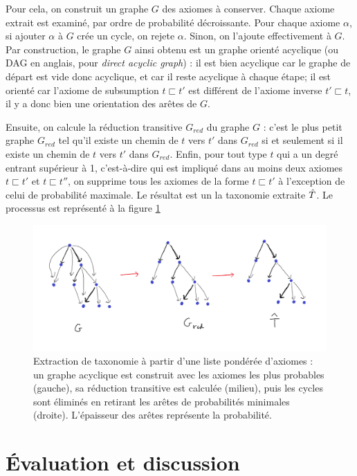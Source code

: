 Pour cela, on construit un graphe $G$ des axiomes à conserver. Chaque axiome extrait est examiné, par ordre de probabilité décroissante. Pour chaque axiome $\alpha$, si ajouter $\alpha$ à $G$ crée un cycle, on rejete $\alpha$. Sinon, on l'ajoute effectivement à $G$. Par construction, le graphe $G$ ainsi obtenu est un graphe orienté acyclique (ou DAG en anglais, pour \textit{direct acyclic graph}) : il est bien acyclique car le graphe de départ est vide donc acyclique, et car il reste acyclique à chaque étape; il est orienté car l'axiome de subsumption $t \sqsubset t'$ est différent de l'axiome inverse $t' \sqsubset t$, il y a donc bien une orientation des arêtes de $G$. 

Ensuite, on calcule la réduction transitive $G_{red}$ du graphe $G$ : c'est le plus petit graphe $G_{red}$ tel qu'il existe un chemin de $t$ vers $t'$ dans $G_{red}$ si et seulement si il existe un chemin de $t$ vers $t'$ dans $G_{red}$. Enfin, pour tout type $t$ qui a un degré entrant supérieur à 1, c'est-à-dire qui est impliqué dans au moins deux axiomes $t \sqsubset t'$ et $t\sqsubset t''$, on supprime tous les axiomes de la forme $t \sqsubset t'$ à l'exception de celui de probabilité maximale. Le résultat est un la taxonomie extraite $\hat{T}$. Le processus est représenté à la figure \ref{fig:softmapping-extraction}

\begin{figure}
    \centering
    \includegraphics[width=\textwidth]{img/softmapping_extraction.png}
    \caption{Extraction de taxonomie à partir d'une liste pondérée d'axiomes : un graphe acyclique est construit avec les axiomes les plus probables (gauche), sa réduction transitive est calculée (milieu), puis les cycles sont éliminés en retirant les arêtes de probabilités minimales (droite). L'épaisseur des arêtes représente la probabilité.}
    \label{fig:softmapping-extraction}
\end{figure}

\section{Évaluation et discussion}
\label{sec:te-evaluation}

